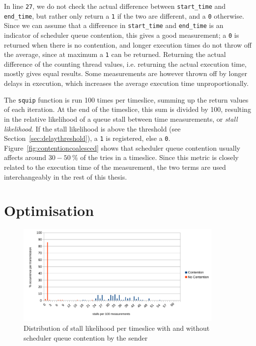 \documentclass[11pt,
  titlepage=false,
  parskip=half,      %
]{scrreprt}
\begin{document}
In line \texttt{27}, we do not check the actual difference between \texttt{start\_time} and \texttt{end\_time},
but rather only return a \texttt{1} if the two are different, and a \texttt{0} otherwise.
Since we can assume that a difference in \texttt{start\_time} and \texttt{end\_time} is an indicator of scheduler queue contention,
this gives a good measurement;
a \texttt{0} is returned when there is no contention, and longer execution times do not throw off the average,
since at maximum a \texttt{1} can be returned.
Returning the actual difference of the counting thread values, i.e. returning the actual execution time, mostly gives equal results.
Some measurements are however thrown off by longer delays in execution,
which increases the average execution time unproportionally.

The \texttt{squip} function is run 100 times per timeslice, summing up the return values of each iteration.
At the end of the timeslice, this sum is divided by 100,
resulting in the relative likelihood of a queue stall between time measurements, or \textit{stall likelihood}.
If the stall likelihood is above the threshold (see Section~\ref{sec:delaythreshold}), a \texttt{1} is registered, else a \texttt{0}.
Figure~\ref{fig:contentioncoalesced} shows that scheduler queue contention usually affects around $30-50~\%$ of the tries in a timeslice.
Since this metric is closely related to the execution time of the measurement, the two terms are used interchangeably in the rest of this thesis.


\chapter{Optimisation}
\label{ch:optimisation}
\begin{figure}
\centering
\includegraphics[width=0.9\textwidth]{figures/contentionhistogram}

\caption{Distribution of stall likelihood per timeslice with and without scheduler queue contention by the sender}
\label{fig:contentionhistogram}
\end{figure}
\end{document}
